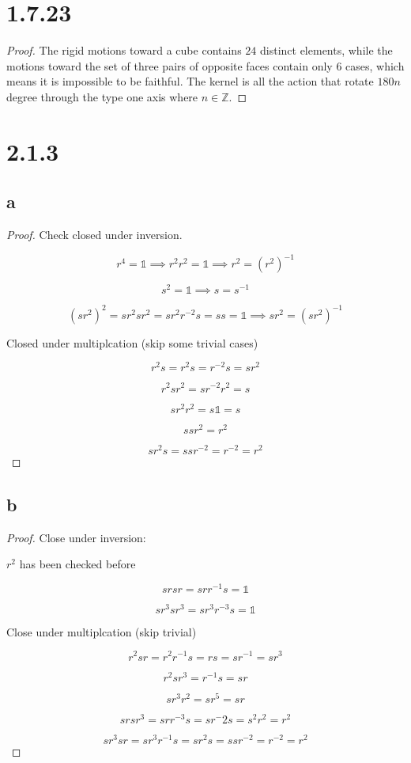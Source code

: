 \documentclass[11pt]{article}
\newcommand{\one}{\mathds{1}}
\newcommand{\Z}{\mathbb{Z}}
\begin{document}
\section*{1.7.23}

\begin{proof}
	The rigid motions toward a cube contains $24$ distinct elements,
	while the motions toward the set of three pairs of opposite faces contain only $6$ cases,
	which means it is impossible to be faithful.
	The kernel is all the action that rotate $180n$ degree through the type one axis where $n \in \Z$.
\end{proof}

\section*{2.1.3}
\subsection*{a}

\begin{proof}
	Check closed under inversion.

	\[
		r^4 = \one \implies r^2r^2 = \one \implies r^2 = {(r^2)}^{-1}
	\]

	\[
		s^2 = \one \implies s=s^{-1}
	\]

	\[
		(sr^2)^2 = sr^2sr^2 = sr^2r^{-2}s=ss=\one \implies sr^2 = (sr^2)^{-1}
	\]

	Closed under multiplcation (skip some trivial cases)

	\[
		r^2s=r^2s = r^{-2} s = sr^2
	\]

	\[
		r^2 sr^2 = sr^{-2}r^2 = s
	\]

	\[
		sr^2r^2=s\one=s
	\]

	\[
		ssr^2 = r^2
	\]

	\[
		sr^2s=ssr^{-2}=r^{-2}=r^{2}
	\]
\end{proof}

\subsection*{b}

\begin{proof}
	Close under inversion:

	$r^2$ has been checked before

	\[
		srsr=srr^{-1}s=\one
	\]

	\[
		sr^3sr^3=sr^3r^{-3}s=\one
	\]

	Close under multiplcation (skip trivial)

	\[
		r^2 sr = r^2r^{-1}s=rs=sr^{-1}=sr^3
	\]

	\[
		r^2sr^3=r^{-1}s=sr
	\]

	\[
		sr^3r^2=sr^5=sr
	\]

	\[
		srsr^3=srr^{-3}s=sr^-2s=s^2r^2=r^2
	\]

	\[
		sr^3sr=sr^3r^{-1}s=sr^2s=ssr^{-2}=r^{-2}=r^2
	\]
\end{proof}
\end{document}
